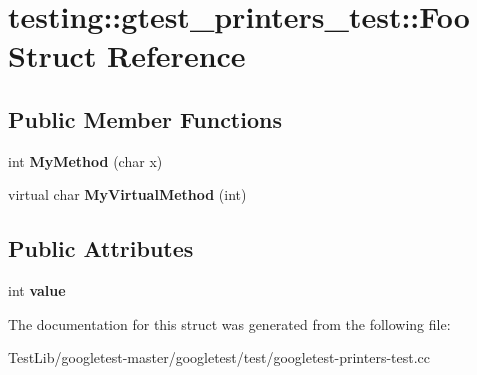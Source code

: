 \hypertarget{structtesting_1_1gtest__printers__test_1_1Foo}{}\section{testing\+:\+:gtest\+\_\+printers\+\_\+test\+:\+:Foo Struct Reference}
\label{structtesting_1_1gtest__printers__test_1_1Foo}
\subsection*{Public Member Functions}
\begin{DoxyCompactItemize}
\item 
\mbox{\label{structtesting_1_1gtest__printers__test_1_1Foo_a703c1159114f3a640b16d470a9613672}} 
int {\bfseries My\+Method} (char x)
\item 
\mbox{\label{structtesting_1_1gtest__printers__test_1_1Foo_a368dc5150b27c2aaca6034830334e1cd}} 
virtual char {\bfseries My\+Virtual\+Method} (int)
\end{DoxyCompactItemize}
\subsection*{Public Attributes}
\begin{DoxyCompactItemize}
\item 
\mbox{\label{structtesting_1_1gtest__printers__test_1_1Foo_a8171a69191d34071ea4448d2dda501ec}} 
int {\bfseries value}
\end{DoxyCompactItemize}


The documentation for this struct was generated from the following file\+:\begin{DoxyCompactItemize}
\item 
Test\+Lib/googletest-\/master/googletest/test/googletest-\/printers-\/test.\+cc\end{DoxyCompactItemize}
